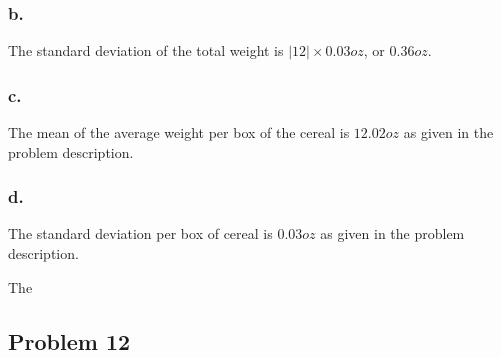 \documentclass[11pt]{article}
\begin{document}
\subsubsection{b.}
The standard deviation of the total weight is $|12|\times 0.03 oz$, or $0.36 oz$.

\subsubsection{c.}
The mean of the average weight per box of the cereal is $12.02 oz$ as given in the
problem description.

\subsubsection{d.}
The standard deviation per box of cereal is $0.03 oz$ as given in the problem
description. 

The 


\subsection{Problem 12}
\end{document}
